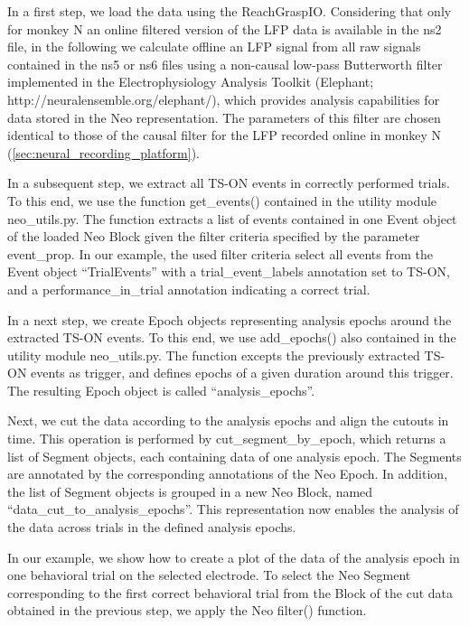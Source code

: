 {In a first step, we load the data using the ReachGraspIO. Considering that only for monkey N an online filtered version of the LFP data is available in the ns2 file, in the following we calculate offline an LFP signal from all raw signals contained in the ns5 or ns6 files using a non-causal low-pass Butterworth filter implemented in the Electrophysiology Analysis Toolkit (Elephant; http://neuralensemble.org/elephant/), which provides analysis capabilities for data stored in the Neo representation. The parameters of this filter are chosen identical to those of the causal filter for the LFP recorded online in monkey N (\ref{sec:neural_recording_platform}).

In a subsequent step, we extract all TS-ON events in correctly performed trials. To this end, we use the function get\_events() contained in the utility module neo\_utils.py. The function extracts a list of events contained in one Event object of the loaded Neo Block given the filter criteria specified by the parameter event\_prop. In our example, the used filter criteria select all events from the Event object “TrialEvents” with a trial\_event\_labels annotation set to TS-ON, and a performance\_in\_trial annotation indicating a correct trial.

In a next step, we create Epoch objects representing analysis epochs around the extracted TS-ON events. To this end, we use add\_epochs() also contained in the utility module neo\_utils.py. The function excepts the previously extracted TS-ON events as trigger, and defines epochs of a given duration around this trigger. The resulting Epoch object is called “analysis\_epochs”. 

Next, we cut the data according to the analysis epochs and align the cutouts in time. This operation is performed by cut\_segment\_by\_epoch, which returns a list of Segment objects, each containing data of one analysis epoch. The Segments are annotated by the corresponding annotations of the Neo Epoch. In addition, the list of Segment objects is grouped in a new Neo Block, named “data\_cut\_to\_analysis\_epochs”. This representation now enables the analysis of the data across trials in the defined analysis epochs. 

In our example, we show how to create a plot of the data of the analysis epoch in one behavioral trial on the selected electrode. To select the Neo Segment corresponding to the first correct behavioral trial from the Block of the cut data obtained in the previous step, we apply the Neo filter() function. 

}
